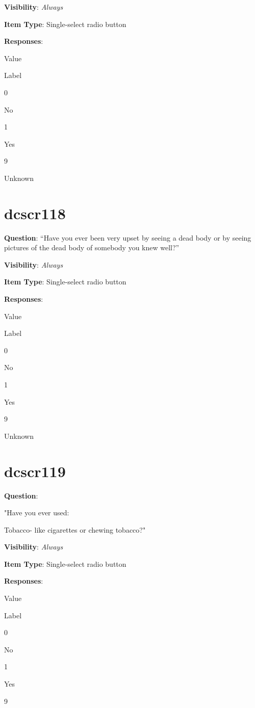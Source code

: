 \documentclass[]{book}
\begin{document}
\textbf{Visibility}: \emph{Always}

\textbf{Item Type}: Single-select radio button

\textbf{Responses}:

Value

Label

0

No

1

Yes

9

Unknown

\hypertarget{dcscr118}{%
\section{dcscr118}\label{dcscr118}}

\textbf{Question}: ``Have you ever been very upset by seeing a dead body or by seeing pictures of the dead body of somebody you knew well?''

\textbf{Visibility}: \emph{Always}

\textbf{Item Type}: Single-select radio button

\textbf{Responses}:

Value

Label

0

No

1

Yes

9

Unknown

\hypertarget{dcscr119}{%
\section{dcscr119}\label{dcscr119}}

\textbf{Question}:

"Have you ever used:

Tobacco- like cigarettes or chewing tobacco?"

\textbf{Visibility}: \emph{Always}

\textbf{Item Type}: Single-select radio button

\textbf{Responses}:

Value

Label

0

No

1

Yes

9
\end{document}
